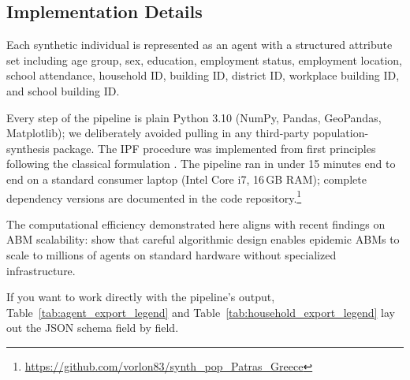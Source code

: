 \documentclass{article}
\begin{document}
\subsection{Implementation Details}\label{implementation-details}

Each synthetic individual is represented as an agent with a structured attribute set including age group, sex, education, employment status, employment location, school attendance, household ID, building ID, district ID, workplace building ID, and school building ID.

Every step of the pipeline is plain Python 3.10 (NumPy, Pandas, GeoPandas, Matplotlib); we deliberately avoided pulling in any third-party population-synthesis package. The IPF procedure was implemented from first principles following the classical formulation \citep{deming1940least}. The pipeline ran in under 15 minutes end to end on a standard consumer laptop (Intel Core i7, 16\,GB RAM); complete dependency versions are documented in the code repository.\footnote{\url{https://github.com/vorlon83/synth_pop_Patras_Greece}}

The computational efficiency demonstrated here aligns with recent findings on ABM scalability: \citet{Thomas2023Scaling} show that careful algorithmic design enables epidemic ABMs to scale to millions of agents on standard hardware without specialized infrastructure.

If you want to work directly with the pipeline's output, Table~\ref{tab:agent_export_legend} and Table~\ref{tab:household_export_legend} lay out the JSON schema field by field.
\end{document}
